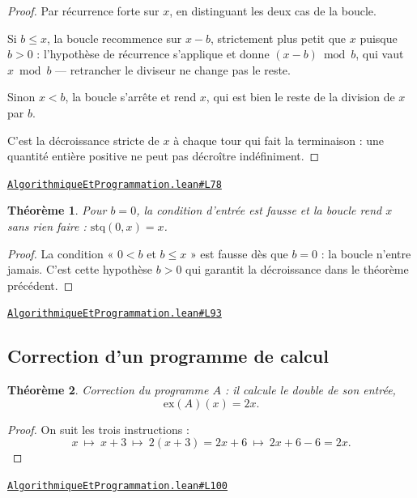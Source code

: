 \documentclass[11pt,a4paper]{article}
\theoremstyle{definition}
\theoremstyle{plain}
\newtheorem{theoreme}{Théorème}
\newcommand{\source}[2]{\par\smallskip\noindent\hfill{\footnotesize\href{#1}{\texttt{#2}}}\par\smallskip}
\begin{document}
\begin{proof}
Par récurrence forte sur $x$, en distinguant les deux cas de la boucle.

Si $b \le x$, la boucle recommence sur $x - b$, strictement plus petit que $x$ puisque
$b > 0$ : l'hypothèse de récurrence s'applique et donne $(x - b) \bmod b$, qui vaut
$x \bmod b$ — retrancher le diviseur ne change pas le reste.

Sinon $x < b$, la boucle s'arrête et rend $x$, qui est bien le reste de la division de
$x$ par $b$.

C'est la décroissance stricte de $x$ à chaque tour qui fait la terminaison : une quantité
entière positive ne peut pas décroître indéfiniment.
\end{proof}
\source{https://github.com/Commutator-IO/learn-lean/blob/main/cours/01-college/07-algorithmique-et-programmation/AlgorithmiqueEtProgrammation.lean\#L78}{AlgorithmiqueEtProgrammation.lean\#L78}

\begin{theoreme}
Pour $b = 0$, la condition d'entrée est fausse et la boucle rend $x$ sans rien
faire : $\mathrm{stq}(0, x) = x$.
\end{theoreme}

\begin{proof}
La condition « $0 < b$ et $b \le x$ » est fausse dès que $b = 0$ : la boucle n'entre
jamais. C'est cette hypothèse $b > 0$ qui garantit la décroissance dans le théorème
précédent.
\end{proof}
\source{https://github.com/Commutator-IO/learn-lean/blob/main/cours/01-college/07-algorithmique-et-programmation/AlgorithmiqueEtProgrammation.lean\#L93}{AlgorithmiqueEtProgrammation.lean\#L93}

\subsection{Correction d'un programme de calcul}

\begin{theoreme}
Correction du programme $A$ : il calcule le double de son entrée,
\[ \mathrm{ex}(A)(x) = 2x . \]
\end{theoreme}

\begin{proof}
On suit les trois instructions :
\[ x \ \longmapsto\ x + 3 \ \longmapsto\ 2(x+3) = 2x + 6 \ \longmapsto\ 2x + 6 - 6 = 2x . \]
\end{proof}
\source{https://github.com/Commutator-IO/learn-lean/blob/main/cours/01-college/07-algorithmique-et-programmation/AlgorithmiqueEtProgrammation.lean\#L100}{AlgorithmiqueEtProgrammation.lean\#L100}
\end{document}
